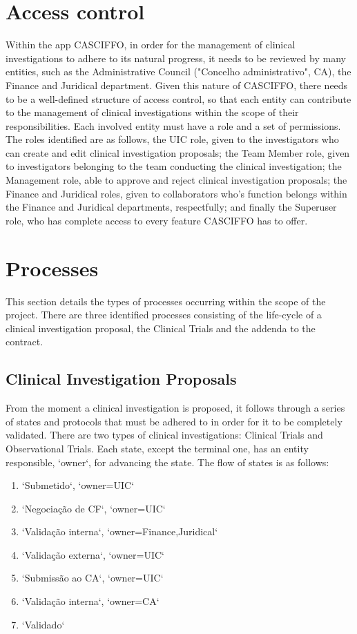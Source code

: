 \section{Access control}
\label{sec:access-control}
Within the app CASCIFFO, in order for the management of clinical investigations to adhere to its natural progress, it needs to be reviewed by many entities, such as the Administrative Council ("Concelho administrativo", CA), the Finance and Juridical department.
Given this nature of CASCIFFO, there needs to be a well-defined structure of access control, so that each entity can contribute to the management of clinical investigations within the scope of their responsibilities. Each involved entity must have a role and a set of permissions.  
The roles identified are as follows, the UIC role, given to the investigators who can create and edit clinical investigation proposals; the Team Member role, given to investigators belonging to the team conducting the clinical investigation; the Management role, able to approve and reject clinical investigation proposals; the Finance and Juridical roles, given to collaborators who's function belongs within the Finance and Juridical departments, respectfully; and finally the Superuser role, who has complete access to every feature CASCIFFO has to offer.

\section{Processes} 
\label{sec:processes}
This section details the types of processes occurring within the scope of the project.  
There are three identified processes consisting of the life-cycle of a clinical investigation proposal, the Clinical Trials and the addenda to the contract. 



\subsection{Clinical Investigation Proposals}
\label{subsec:clinical-investigation-proposals}
From the moment a clinical investigation is proposed, it follows through a series of states and protocols that must be adhered to in order for it to be completely validated.
There are two types of clinical investigations: Clinical Trials and Observational Trials.  
Each state, except the terminal one, has an entity responsible, `owner`, for advancing the state. 
The flow of states is as follows:  
\begin{enumerate}
    \item `Submetido`, `owner=UIC`
    \item `Negociação de CF`, `owner=UIC`
    \item `Validação interna`, `owner=Finance,Juridical`
    \item `Validação externa`, `owner=UIC`
    \item `Submissão ao CA`, `owner=UIC`
    \item `Validação interna`, `owner=CA`
    \item `Validado`
\end{enumerate}

